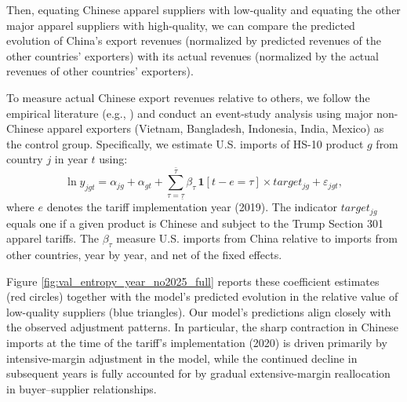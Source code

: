 \documentclass[12pt]{article} \usepackage{amsmath,amssymb,amsthm,geometry,graphicx,setspace,algorithm,algpseudocode,float}
\begin{document}
Then, equating Chinese apparel suppliers with low-quality and equating the other major apparel suppliers with high-quality, we can compare the predicted evolution of China's export revenues (normalized by predicted revenues of the other countries' exporters) with its actual revenues (normalized by the actual revenues of other countries' exporters).
\par
To measure actual Chinese export revenues relative to others, we follow the empirical literature (e.g., \cite{Fajgelbaum2024}) and conduct an event-study analysis using major non-Chinese apparel exporters (Vietnam, Bangladesh, Indonesia, India, Mexico) as the control group. Specifically, we estimate U.S. imports of HS-10 product $g$ from country $j$ in year $t$ using:
\begin{equation*}\label{eq:eventstudy}
    \ln y_{jgt}
= \alpha_{jg} + \alpha_{gt}
+ \sum_{\tau = \underline{\tau}}^{\bar{\tau}} \beta_{\tau}\, \mathbf{1}[t - e = \tau] \times target_{jg}
+ \varepsilon_{jgt},
\end{equation*}
where $e$ denotes the tariff implementation year (2019). The indicator $target_{jg}$ equals one if a given product is Chinese and subject to the Trump Section 301 apparel tariffs. The $\beta_{\tau}$ measure U.S. imports from China relative to imports from other countries, year by year, and net of the fixed effects.
\par
 Figure \ref{fig:val_entropy_year_no2025_full} reports these coefficient estimates (red circles) together with the model’s predicted evolution in the relative value of low-quality suppliers (blue triangles). Our model's predictions align closely with the observed adjustment patterns. In particular, the sharp contraction in Chinese imports at the time of the tariff’s implementation (2020) is driven primarily by intensive-margin adjustment in the model, while the continued decline in subsequent years is fully accounted for by gradual extensive-margin reallocation in buyer--supplier relationships.
\end{document}
